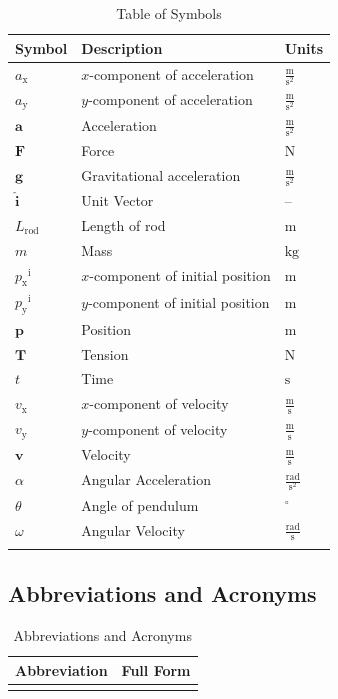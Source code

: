 \documentclass[12pt]{article}
\begin{document}
\begin{longtable}{l l l}
\toprule
\textbf{Symbol} & \textbf{Description} & \textbf{Units}
\\
\midrule
\endhead
${a_{\text{x}}}$ & $x$-component of acceleration & $\frac{\text{m}}{\text{s}^{2}}$
\\
${a_{\text{y}}}$ & $y$-component of acceleration & $\frac{\text{m}}{\text{s}^{2}}$
\\
$\mathbf{a}$ & Acceleration & $\frac{\text{m}}{\text{s}^{2}}$
\\
$\mathbf{F}$ & Force & ${\text{N}}$
\\
$\mathbf{g}$ & Gravitational acceleration & $\frac{\text{m}}{\text{s}^{2}}$
\\
$\mathbf{\hat{i}}$ & Unit Vector & --
\\
${L_{\text{rod}}}$ & Length of rod & ${\text{m}}$
\\
$m$ & Mass & ${\text{kg}}$
\\
${{p_{\text{x}}}^{\text{i}}}$ & $x$-component of initial position & ${\text{m}}$
\\
${{p_{\text{y}}}^{\text{i}}}$ & $y$-component of initial position & ${\text{m}}$
\\
$\mathbf{p}$ & Position & ${\text{m}}$
\\
$\mathbf{T}$ & Tension & ${\text{N}}$
\\
$t$ & Time & ${\text{s}}$
\\
${v_{\text{x}}}$ & $x$-component of velocity & $\frac{\text{m}}{\text{s}}$
\\
${v_{\text{y}}}$ & $y$-component of velocity & $\frac{\text{m}}{\text{s}}$
\\
$\mathbf{v}$ & Velocity & $\frac{\text{m}}{\text{s}}$
\\
$α$ & Angular Acceleration & $\frac{\text{rad}}{\text{s}^{2}}$
\\
$θ$ & Angle of pendulum & ${{}^{\circ}}$
\\
$ω$ & Angular Velocity & $\frac{\text{rad}}{\text{s}}$
\\
\bottomrule
\caption{Table of Symbols}
\label{Table:ToS}
\end{longtable}
\subsection{Abbreviations and Acronyms}
\label{Sec:TAbbAcc}
\begin{longtable}{l l}
\toprule
\textbf{Abbreviation} & \textbf{Full Form}
\\
\midrule
\endhead
\bottomrule
\caption{Abbreviations and Acronyms}
\label{Table:TAbbAcc}
\end{longtable}
\end{document}

